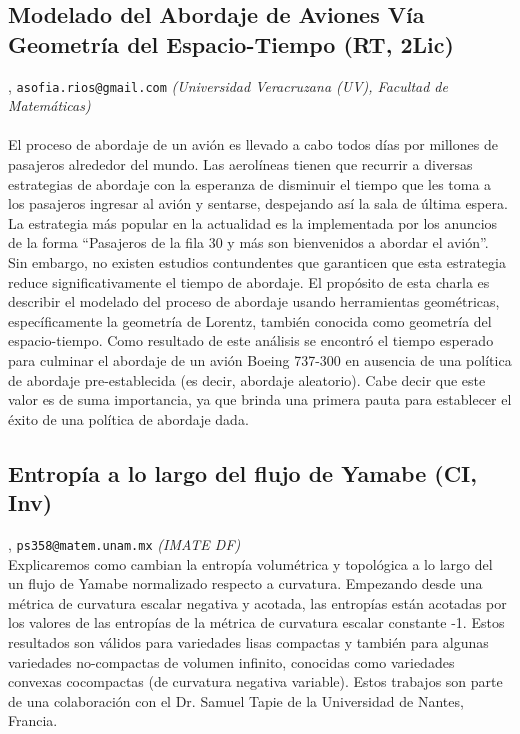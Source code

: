 \subsection{\sffamily Modelado del Abordaje de Aviones V\'ia Geometr\'ia del Espacio-Tiempo {\footnotesize (RT, 2Lic)}} \label{reg-486} 
, {\tt asofia.rios@gmail.com}  {\slshape (Universidad Veracruzana (UV), Facultad de Matem\'aticas)}\\
\\
\noindent El proceso de abordaje de un avi\'on es llevado a cabo todos d\'ias por millones de pasajeros alrededor del mundo. Las aerol\'ineas tienen que recurrir a diversas estrategias de abordaje con la esperanza de disminuir el tiempo que les toma a los pasajeros ingresar al avi\'on y sentarse,  despejando as\'i la sala de \'ultima espera. La estrategia m\'as popular en la actualidad es la implementada por los anuncios de la forma ``Pasajeros de la fila 30 y m\'as son bienvenidos a abordar el avi\'on''. Sin embargo, no existen estudios contundentes que garanticen que esta estrategia reduce significativamente el tiempo de abordaje. El prop\'osito de esta charla es describir el modelado del proceso de abordaje usando herramientas geom\'etricas, espec\'ificamente la geometr\'ia de Lorentz, tambi\'en conocida como geometr\'ia del espacio-tiempo. Como resultado de este an\'alisis se encontr\'o el tiempo esperado para  culminar el abordaje de un avi\'on Boeing 737-300 en ausencia de una pol\'itica de abordaje pre-establecida (es decir, abordaje aleatorio). Cabe decir que este valor es de suma importancia, ya que brinda una primera pauta para establecer el \'exito de una pol\'itica de abordaje dada.
\subsection{\sffamily Entrop\'ia a lo largo del flujo de Yamabe {\footnotesize (CI, Inv)}} \label{reg-1366} 
, {\tt ps358@matem.unam.mx}  {\slshape (IMATE DF)}\\
          \noindent Explicaremos como cambian la entrop\'ia volum\'etrica y topol\'ogica a lo largo del un flujo de Yamabe normalizado respecto a curvatura. Empezando desde una m\'etrica de curvatura escalar negativa y acotada, las entrop\'ias est\'an acotadas por los valores de las entrop\'ias de la m\'etrica de curvatura escalar constante -1. Estos resultados son v\'alidos para variedades lisas compactas y tambi\'en para algunas variedades no-compactas de volumen infinito, conocidas como variedades convexas cocompactas (de curvatura negativa variable).  Estos trabajos son parte de una colaboraci\'on con el Dr. Samuel Tapie de la Universidad de Nantes, Francia.
